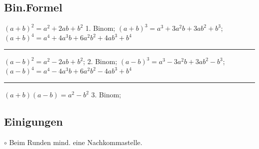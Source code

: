 \subsection{Bin.Formel}
$ (a + b)^2 = a^2 + 2ab + b^2 $ 1. Binom;
$ (a+b)^3 = a^3 + 3a^2b + 3ab^2 + b^3 $; 
$ (a+b)^4 = a^4 + 4a^3b + 6a^2b^2 + 4ab^3 + b^4$
\hrule
$ (a-b)^2 = a^2 - 2ab + b^2 $; 2. Binom;
$ (a-b)^3 = a^3 - 3a^2b + 3ab^2 - b^3$; 
$ (a-b)^4 = a^4 - 4a^3b + 6a^2b^2 - 4ab^3 + b^4 $
\hrule
$ (a+b) (a-b) = a^2 - b^2 $ 3. Binom; 

\subsection{Einigungen}
	$\circ$ Beim Runden mind. eine Nachkommastelle.
